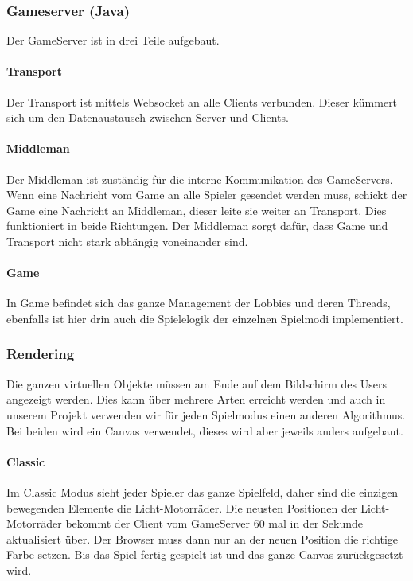 \documentclass[11pt,ngerman]{article}
\begin{document}
    \subsubsection{Gameserver  (Java)}
    Der GameServer ist in drei Teile aufgebaut.

    \paragraph{Transport}
    Der Transport ist mittels Websocket an alle Clients verbunden. Dieser kümmert sich um den Datenaustausch zwischen Server und Clients.

    \paragraph{Middleman}
    Der Middleman ist zuständig für die interne Kommunikation des GameServers. Wenn eine Nachricht vom Game an alle Spieler gesendet werden muss, schickt der Game eine Nachricht an Middleman, dieser leite sie weiter an Transport. Dies funktioniert in beide Richtungen. Der Middleman sorgt dafür, dass Game und Transport nicht stark abhängig voneinander sind.

    \paragraph{Game}
    In Game befindet sich das ganze Management der Lobbies und deren Threads, ebenfalls ist hier drin auch die Spielelogik der einzelnen Spielmodi implementiert.

    \subsubsection{Rendering}
    Die ganzen virtuellen Objekte müssen am Ende auf dem Bildschirm des Users angezeigt werden. Dies kann über mehrere Arten erreicht werden und auch in unserem Projekt verwenden wir für jeden Spielmodus einen anderen Algorithmus. Bei beiden wird ein \Gls{Canvas} verwendet, dieses wird aber jeweils anders aufgebaut.

    \paragraph{Classic}
    Im Classic Modus sieht jeder Spieler das ganze Spielfeld, daher sind die einzigen bewegenden Elemente die Licht-Motorräder. Die neusten Positionen der Licht-Motorräder bekommt der Client vom GameServer 60 mal in der Sekunde aktualisiert über. Der Browser muss dann nur an der neuen Position die richtige Farbe setzen. Bis das Spiel fertig gespielt ist und das ganze \Gls{Canvas} zurückgesetzt wird.
\end{document}
